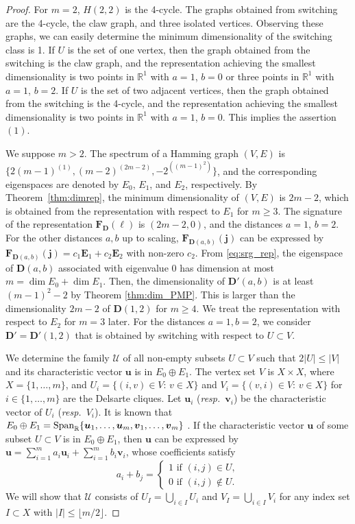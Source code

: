 \documentclass[a4paper, 11pt]{article}
\newcommand{\R}{\mathbb{R}}
\newcommand{\E}{\boldsymbol{E}}
\newcommand{\D}{\boldsymbol{D}}
\newcommand{\F}{\boldsymbol{F}}
\newcommand{\jv}{\boldsymbol{j}}
\newcommand{\vv}{\boldsymbol{v}}
\newcommand{\uv}{\boldsymbol{u}}
\newcommand{\el}{\boldsymbol{\ell}}
\theoremstyle{definition}
\begin{document}
\begin{proof}
For $m=2$, $H(2,2)$ is the 4-cycle. 
The graphs obtained from switching are the 4-cycle, the claw graph, and three isolated vertices. 
Observing these graphs, we can easily determine the minimum dimensionality of the switching class is 1. 
If $U$ is the set of one vertex, then the graph obtained from the switching is the claw graph, and  
the representation achieving the smallest dimensionality is two points in $\R^1$ with $a=1$, $b=0$ or three points in $\R^1$ with $a=1$, $b=2$. 
If $U$ is the set of two adjacent vertices, then the graph obtained from the switching is the 4-cycle, and the representation achieving the smallest dimensionality is two points in $\R^1$ with $a=1$, $b=0$. This implies the assertion $(1)$. 

We suppose $m> 2$. 
The spectrum of a Hamming graph $(V,E)$ is $\{2(m-1)^{(1)},(m-2)^{(2m-2)}, -2^{((m-1)^2)}\}$, and the corresponding eigenspaces are denoted by $E_0$, $E_1$, and $E_2$, respectively.  By Theorem~\ref{thm:dimrep}, the minimum dimensionality of $(V,E)$ is $2m-2$, which is obtained from the representation with respect to $E_1$ for $m\geq 3$. The signature of the representation $\F_{\D}(\el)$ is $(2m-2,0)$, and the distances $a=1$, $b=2$.  
  For the other distances $a,b$ up to scaling, $\F_{\D(a,b)}(\jv)$ can be expressed by $\F_{\D(a,b)}(\jv)=c_1 \E_1+c_2 \E_2$ with non-zero $c_2$.  
  From \eqref{eq:srg_rep}, the eigenspace of $\D(a,b)$ associated with eigenvalue 0 has dimension at most $m= \dim E_0 +\dim E_1$.   
  Then, the dimensionality of $\D'(a,b)$ is at least $(m-1)^2-2$ by Theorem \ref{thm:dim_PMP}. This is larger than the dimensionality $2m-2$ of $\D(1,2)$ for $m\geq 4$.  We treat the representation with respect to $E_2$ for $m=3$ later. 
For the distances $a=1,b=2$, we consider $\D'=\D'(1,2)$ that is obtained by switching with respect to $U\subset V$. 

We determine the family $\mathcal{U}$ of all non-empty subsets $U\subset V$ such that $2|U| \leq |V|$ and its characteristic vector $\uv$ is in $E_0 \oplus E_1$. 
The vertex set $V$ is $X \times X$, where $X=\{1,\ldots, m\}$, and $U_i=\{(i,v) \in V \colon\,  v \in X\}$ and $V_i=\{(v,i) \in V \colon\,  v \in X\}$ for $i \in\{1,\ldots,m\}$ are the Delsarte cliques. 
Let $\uv_i$ ({\it resp.}\ $\vv_i$) be the characteristic vector of $U_i$ ({\it resp.}\ $V_i$). 
It is known that $E_0 \oplus E_1={\rm Span}_{\mathbb{R}}\{\uv_1,\ldots, \uv_m, \vv_1,\ldots,\vv_m\}$ \cite{M03}.  
If the characteristic vector $\uv$ of some subset $U\subset V$ is in $E_0 \oplus E_1$, then $\uv$ can be expressed by $\uv=\sum_{i=1}^m a_i \uv_i+\sum_{i=1}^m b_i \vv_i$, whose coefficients satisfy 
\begin{equation} \label{eq:a_i2}
a_i+b_j=\begin{cases}
1 \text{ if $(i,j) \in U$},\\
0 \text{ if $(i,j) \not\in U$}.
\end{cases}
\end{equation}
We will show that $\mathcal{U}$ consists of $U_I=\bigcup_{i \in I} U_i$ and $V_I=\bigcup_{i \in I} V_i$ for any index set $I\subset X$ with $|I| \leq \lfloor m/2 \rfloor$. 


\end{proof}
\end{document}
